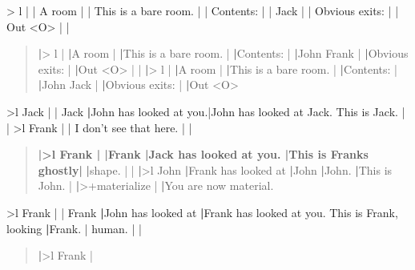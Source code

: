 \documentclass[letterpaper,10pt,english]{sphinxmanual}
\begin{document}
\sphinxAtStartPar
\textgreater{} l                     |                       |
A room                  |                       |
This is a bare room.    |                       |
Contents:               |                       |
Jack                    |                       |
Obvious exits:          |                       |
Out \textless{}O\textgreater{}                 |                       |
\begin{quote}

\sphinxAtStartPar
{\color{red}\bfseries{}|}\textgreater{} l                    |
{\color{red}\bfseries{}|}A room                 |
{\color{red}\bfseries{}|}This is a bare room.   |
{\color{red}\bfseries{}|}Contents:              |
{\color{red}\bfseries{}|}John Frank             |
{\color{red}\bfseries{}|}Obvious exits:         |
{\color{red}\bfseries{}|}Out \textless{}O\textgreater{}                |
|                       {\color{red}\bfseries{}|}\textgreater{} l
|                       {\color{red}\bfseries{}|}A room
|                       {\color{red}\bfseries{}|}This is a bare room.
|                       {\color{red}\bfseries{}|}Contents:
|                       {\color{red}\bfseries{}|}John Jack
|                       {\color{red}\bfseries{}|}Obvious exits:
|                       {\color{red}\bfseries{}|}Out \textless{}O\textgreater{}
\end{quote}

\sphinxAtStartPar
\textgreater{}l Jack                 |                       |
Jack                    {\color{red}\bfseries{}|}John has looked at you.|John has looked at Jack.
This is Jack.           |                       |
\textgreater{}l Frank                |                       |
I don’t see that here.  |                       |
\begin{quote}

\sphinxAtStartPar
{\color{red}\bfseries{}|\textgreater{}l Frank               |
|Frank                  |Jack has looked at you.
|This is Frank\textquotesingle{}s ghostly|}
{\color{red}\bfseries{}|}shape.                 |
|                       {\color{red}\bfseries{}|}\textgreater{}l John
{\color{red}\bfseries{}|}Frank has looked at    {\color{red}\bfseries{}|}John
{\color{red}\bfseries{}|}John.                  {\color{red}\bfseries{}|}This is John.
|                       {\color{red}\bfseries{}|}\textgreater{}+materialize
|                       {\color{red}\bfseries{}|}You are now material.
\end{quote}

\sphinxAtStartPar
\textgreater{}l Frank                |                       |
Frank                   {\color{red}\bfseries{}|}John has looked at     {\color{red}\bfseries{}|}Frank has looked at you.
This is Frank, looking  {\color{red}\bfseries{}|}Frank.                 |
human.                  |                       |
\begin{quote}

\sphinxAtStartPar
{\color{red}\bfseries{}|}\textgreater{}l Frank               |
\end{quote}
\end{document}
